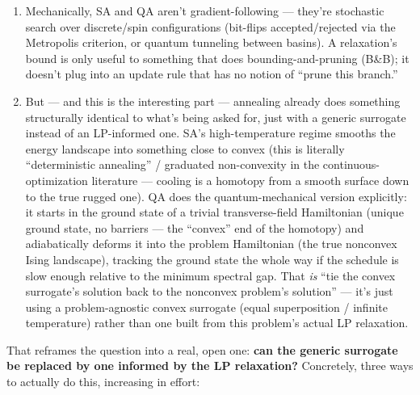 \documentclass[11pt]{article}
\begin{document}
\begin{enumerate}[leftmargin=1.5em]
\item Mechanically, SA and QA aren't gradient-following --- they're stochastic search over discrete/spin configurations (bit-flips accepted/rejected via the Metropolis criterion, or quantum tunneling between basins). A relaxation's bound is only useful to something that does bounding-and-pruning (B\&B); it doesn't plug into an update rule that has no notion of ``prune this branch.''

\item But --- and this is the interesting part --- annealing already does something structurally identical to what's being asked for, just with a generic surrogate instead of an LP-informed one. SA's high-temperature regime smooths the energy landscape into something close to convex (this is literally ``deterministic annealing'' / graduated non-convexity in the continuous-optimization literature --- cooling is a homotopy from a smooth surface down to the true rugged one). QA does the quantum-mechanical version explicitly: it starts in the ground state of a trivial transverse-field Hamiltonian (unique ground state, no barriers --- the ``convex'' end of the homotopy) and adiabatically deforms it into the problem Hamiltonian (the true nonconvex Ising landscape), tracking the ground state the whole way if the schedule is slow enough relative to the minimum spectral gap. That \emph{is} ``tie the convex surrogate's solution back to the nonconvex problem's solution'' --- it's just using a problem-agnostic convex surrogate (equal superposition / infinite temperature) rather than one built from this problem's actual LP relaxation.
\end{enumerate}

That reframes the question into a real, open one: \textbf{can the generic surrogate be replaced by one informed by the LP relaxation?} Concretely, three ways to actually do this, increasing in effort:
\end{document}
